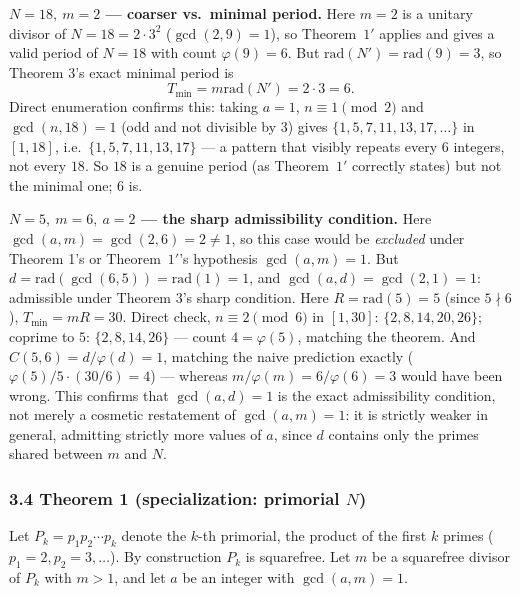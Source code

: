 \documentclass[
]{article}
\begin{document}
\textbf{\(N=18,\ m=2\) --- coarser vs.~minimal period.} Here \(m=2\) is
a unitary divisor of \(N=18=2\cdot3^2\) (\(\gcd(2,9)=1\)), so Theorem~\(1'\)
applies and gives a valid period of \(N=18\) with count
\(\varphi(9)=6\). But \(\mathrm{rad}(N')=\mathrm{rad}(9)=3\), so Theorem
3's exact minimal period is \[
T_{\min} = m\mathrm{rad}(N') = 2\cdot3 = 6.
\] Direct enumeration confirms this: taking \(a=1\), \(n\equiv1\pmod2\)
and \(\gcd(n,18)=1\) (odd and not divisible by \(3\)) gives
\(\{1,5,7,11,13,17,\dots\}\) in \([1,18]\), i.e.~\(\{1,5,7,11,13,17\}\)
--- a pattern that visibly repeats every \(6\) integers, not every
\(18\). So \(18\) is a genuine period (as Theorem~\(1'\) correctly states)
but not the minimal one; \(6\) is.

\textbf{\(N=5,\ m=6,\ a=2\) --- the sharp admissibility condition.} Here
\(\gcd(a,m)=\gcd(2,6)=2\ne1\), so this case would be \emph{excluded}
under Theorem 1's or Theorem~\(1'\)'s hypothesis \(\gcd(a,m)=1\). But
\(d=\mathrm{rad}(\gcd(6,5))=\mathrm{rad}(1)=1\), and
\(\gcd(a,d)=\gcd(2,1)=1\): admissible under Theorem 3's sharp condition.
Here \(R=\mathrm{rad}(5)=5\) (since \(5\nmid6\)), \(T_{\min}=mR=30\).
Direct check, \(n\equiv2\pmod6\) in \([1,30]\): \(\{2,8,14,20,26\}\);
coprime to \(5\): \(\{2,8,14,26\}\) --- count \(4=\varphi(5)\), matching
the theorem. And \(C(5,6)=d/\varphi(d)=1\), matching the naive
prediction exactly (\(\varphi(5)/5\cdot(30/6)=4\)) --- whereas
\(m/\varphi(m)=6/\varphi(6)=3\) would have been wrong. This confirms
that \(\gcd(a,d)=1\) is the exact admissibility condition, not merely a
cosmetic restatement of \(\gcd(a,m)=1\): it is strictly weaker in
general, admitting strictly more values of \(a\), since \(d\) contains
only the primes shared between \(m\) and \(N\).

\subsubsection{\texorpdfstring{3.4 Theorem 1 (specialization: primorial
\(N\))}{3.4 Theorem 1 (specialization: primorial N)}}\label{theorem-1-specialization-primorial-n}

Let \(P_k = p_1p_2\cdots p_k\) denote the \(k\)-th primorial, the
product of the first \(k\) primes (\(p_1=2,p_2=3,\dots\)). By
construction \(P_k\) is squarefree. Let \(m\) be a squarefree divisor of
\(P_k\) with \(m>1\), and let \(a\) be an integer with \(\gcd(a,m)=1\).
\end{document}
